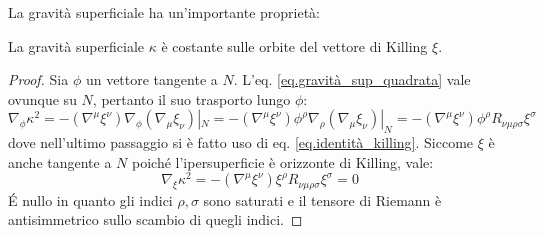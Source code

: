 La gravità superficiale ha un'importante proprietà:
\begin{lemma}
La gravità superficiale $\kappa$ è costante sulle orbite del vettore di Killing $\xi$.
\end{lemma}
\begin{proof}
    Sia $\phi$ un vettore tangente a $N$. L'eq. \ref{eq.gravità_sup_quadrata} vale ovunque su $N$, pertanto il suo trasporto lungo $\phi$:
    \begin{equation*}
        \nabla_\phi \kappa^2 = - (\nabla^\mu \xi^\nu) \nabla_\phi (\nabla_\mu \xi_\nu) |_N = - (\nabla^\mu \xi^\nu) \phi^\rho \nabla_\rho (\nabla_\mu \xi_\nu) |_N = -(\nabla^\mu \xi^\nu)\phi^\rho R_{\nu\mu\rho\sigma}\xi^\sigma
    \end{equation*}
dove nell'ultimo passaggio si è fatto uso di eq. \ref{eq.identità_killing}. Siccome $\xi$ è anche tangente a $N$ poiché l'ipersuperficie è orizzonte di Killing, vale:
\begin{equation*}
    \nabla_\xi \kappa^2 = - (\nabla^\mu \xi^\nu)\xi^\rho R_{\nu\mu\rho\sigma}\xi^\sigma = 0
\end{equation*}
\'E nullo in quanto gli indici $\rho, \sigma$ sono saturati e il tensore di Riemann è antisimmetrico sullo scambio di quegli indici.
\end{proof}

